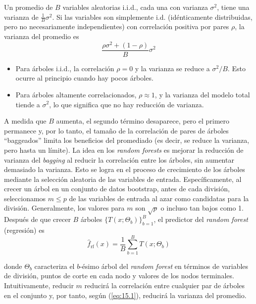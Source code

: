 Un promedio de $B$ variables aleatorias i.i.d., cada una con varianza $\sigma^2$, tiene una varianza de $\frac{1}{B} \sigma^2$. Si las variables son simplemente i.d. (idénticamente distribuidas, pero no necesariamente independientes) con correlación positiva por pares $\rho$, la varianza del promedio es
\begin{equation}
\frac{\rho \sigma^2 + (1 - \rho)}{B} \sigma^2
\label{eq:15.1}
\end{equation}

\begin{itemize}
\item Para árboles i.i.d., la correlación $\rho = 0$ y la varianza se reduce a $\sigma^2/B$. Esto ocurre al principio cuando hay pocos árboles.
\item Para árboles altamente correlacionados, $\rho \approx 1$, y la varianza del modelo total tiende a $\sigma^2$, lo que significa que no hay reducción de varianza.
\end{itemize}

A medida que $B$ aumenta, el segundo término desaparece, pero el primero permanece y, por lo tanto, el tamaño de la correlación de pares de árboles ``baggeados'' limita los beneficios del promediado (es decir, se reduce la varianza, pero hasta un límite). La idea en los \textit{random forests} es mejorar la reducción de varianza del \textit{bagging} al reducir la correlación entre los árboles, sin aumentar demasiado la varianza. Esto se logra en el proceso de crecimiento de los árboles mediante la selección aleatoria de las variables de entrada. Específicamente, al crecer un árbol en un conjunto de datos bootstrap, antes de cada división, seleccionamos $m \leq p$ de las variables de entrada al azar como candidatas para la división. Generalmente, los valores para $m$ son $\sqrt{p}$ o incluso tan bajos como 1.\\

\noindent Después de que crecer $B$ árboles $\{T(x; \Theta_b)\}_{b=1}^B$, el predictor del \textit{random forest} (regresión) es
\begin{equation}
\hat{f}_{\text{rf}}(x) = \frac{1}{B} \sum_{b=1}^{B} T(x; \Theta_b)
\label{eq:15.2}
\end{equation}

\noindent donde $\Theta_b$ caracteriza el $b$-ésimo árbol del \textit{random forest} en términos de variables de división, puntos de corte en cada nodo y valores de los nodos terminales. Intuitivamente, reducir $m$ reducirá la correlación entre cualquier par de árboles en el conjunto y, por tanto, según (\ref{eq:15.1}), reducirá la varianza del promedio. \\

